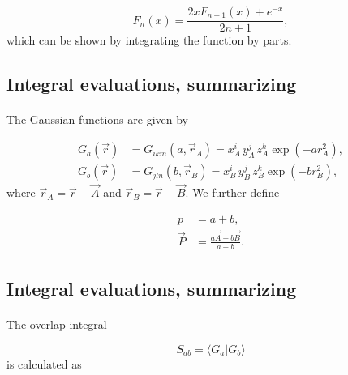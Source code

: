 \documentclass[%
twoside,                 %
final,                   %
10pt]{article}
\begin{document}
\begin{equation}
 F_n(x) = \frac{2xF_{n+1}(x)+e^{-x}}{2n+1},
\end{equation}
which can be shown by integrating the function by parts.



\subsection*{Integral evaluations, summarizing}

\paragraph{}

The Gaussian functions are given by

\begin{equation}
 \begin{split}
  G_a(\vec r) & = G_{ikm}(a, \vec r_A) = x^i_A\,y^j_A\,z^k_A\exp(-a r^2_A), \\
  G_b(\vec r) & = G_{jln}(b, \vec r_B) = x^i_B\,y^j_B\,z^k_B\exp(-b r^2_B),
 \end{split}
\end{equation}
where $\vec r_A = \vec r - \vec A$ and $\vec r_B = \vec r - \vec B$. We further define

\begin{equation}
\begin{split}
  p & = a + b, \\
 \vec P & = \frac{a\vec A + b\vec B}{a + b}.
\end{split}
\end{equation}



\subsection*{Integral evaluations, summarizing}

\paragraph{}

The overlap integral

\begin{equation}
 S_{ab} = \langle G_a|G_b\rangle
\end{equation}
is calculated as
\end{document}
